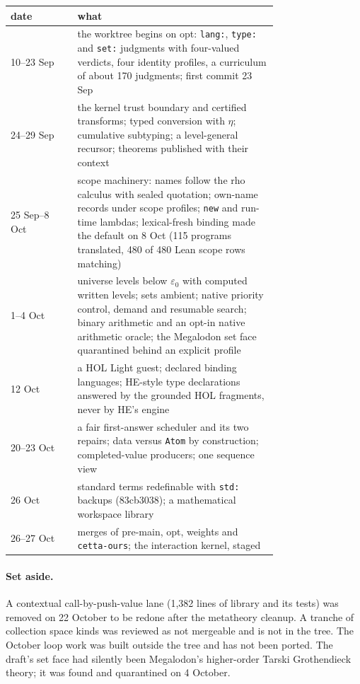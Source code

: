 \documentclass[11pt]{article}
\newcommand{\code}[1]{\texttt{#1}}
\newcommand{\HE}{\textup{HE}}
\begin{document}
\begin{center}
\small
\begin{tabular}{@{}lp{0.75\linewidth}@{}}
\toprule
date & what \\
\midrule
10--23 Sep & the worktree begins on opt: \code{lang:}, \code{type:} and \code{set:} judgments with four-valued verdicts, four identity profiles, a curriculum of about 170 judgments; first commit 23 Sep \\
24--29 Sep & the kernel trust boundary and certified transforms; typed conversion with $\eta$; cumulative subtyping; a level-general recursor; theorems published with their context \\
25 Sep--8 Oct & scope machinery: names follow the rho calculus with sealed quotation; own-name records under scope profiles; \code{new} and run-time lambdas; lexical-fresh binding made the default on 8 Oct (115 programs translated, 480 of 480 Lean scope rows matching) \\
1--4 Oct & universe levels below $\varepsilon_0$ with computed written levels; sets ambient; native priority control, demand and resumable search; binary arithmetic and an opt-in native arithmetic oracle; the Megalodon set face quarantined behind an explicit profile \\
12 Oct & a HOL Light guest; declared binding languages; \HE{}-style type declarations answered by the grounded HOL fragments, never by \HE{}'s engine \\
20--23 Oct & a fair first-answer scheduler and its two repairs; data versus \code{Atom} by construction; completed-value producers; one sequence view \\
26 Oct & standard terms redefinable with \code{std:} backups (83cb3038); a mathematical workspace library \\
26--27 Oct & merges of pre-main, opt, weights and \code{cetta-ours}; the interaction kernel, staged \\
\bottomrule
\end{tabular}
\end{center}

\paragraph{Set aside.}  A contextual call-by-push-value lane (1{,}382 lines of
library and its tests) was removed on 22 October to be redone after the
metatheory cleanup.  A tranche of collection space kinds was reviewed as not
mergeable and is not in the tree.  The October loop work was built outside the tree
and has not been ported.  The draft's set face had silently been Megalodon's higher-order Tarski
Grothendieck theory; it was found and quarantined on 4 October.
\end{document}
